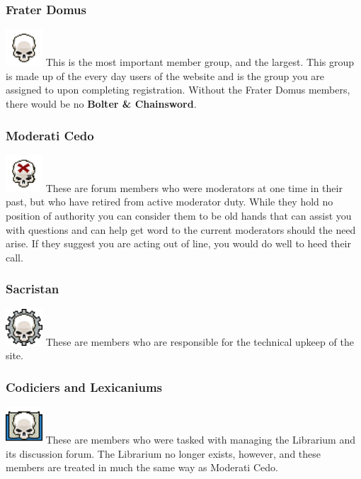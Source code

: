 \documentclass[12pt]{article}
\newcommand{\bnc}{{\textbf{Bolter \& Chainsword}}}%
\begin{document}
\subsubsection{Frater Domus}
\includegraphics[width=39pt, height=39pt]{Frater.png}
This is the most important member group, and the largest. This group is 
made up of the every day users of the website and is the group you are 
assigned to upon completing registration. Without the Frater Domus 
members, there would be no {\bnc}.

\subsubsection{Moderati Cedo}
\includegraphics[width=39pt, height=39pt]{Cedo.png}
These are forum members who were moderators at one time in their past, 
but who have retired from active moderator duty. While they hold no 
position of authority you can consider them to be old hands that can 
assist you with questions and can help get word to the current 
moderators should the need arise. If they suggest you are acting out of 
line, you would do well to heed their call.


\subsubsection{Sacristan}
\includegraphics[width=39pt, height=39pt]{Tech.png}
These are members who are responsible for the technical upkeep of the 
site.


\subsubsection{Codiciers and Lexicaniums}
\includegraphics[width=39pt, height=39pt]{Lib.png}
These are members who were tasked with managing the Librarium and its 
discussion forum. The Librarium no longer exists, however, and these 
members are treated in much the same way as Moderati Cedo.
\end{document}
